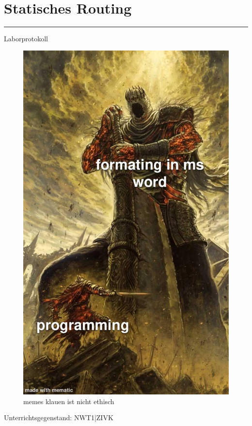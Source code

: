 \documentclass[a4paper]{article}
\begin{document}
\pagestyle{oida}
\section*{Statisches Routing}
\par\noindent\rule{\textwidth}{0.4pt}

Laborprotokoll

\begin{figure}[h]
\includegraphics[scale=0.6]{meme.jpeg}
\caption{memes klauen ist nicht ethisch}
\end{figure}

\vspace*{\fill}
Unterrichtsgegenstand:	NWT1|ZIVK
\end{document}

